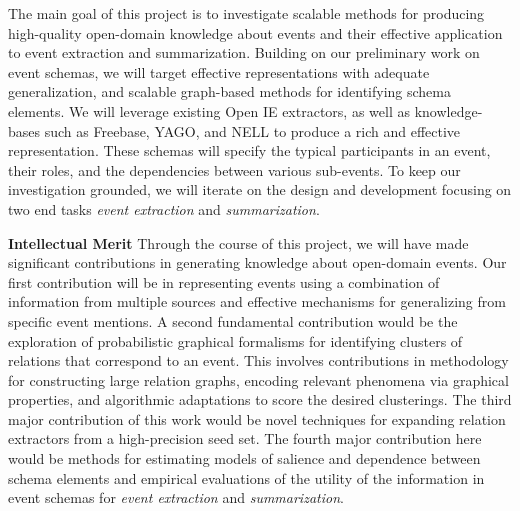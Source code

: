 The main goal of this project is to investigate scalable methods for producing high-quality open-domain knowledge about events and their effective application to event extraction and summarization. Building on our preliminary work on event schemas, we will target effective representations with adequate generalization, and scalable graph-based methods for identifying schema elements. We will leverage existing Open IE extractors, as well as knowledge-bases such as Freebase, YAGO, and NELL to produce a rich and effective representation. These schemas will specify the typical participants in an event, their roles, and the dependencies between various sub-events. To keep our investigation grounded, we will iterate on the design and development focusing on two end tasks {\em event extraction} and {\em summarization}. %

{\bf Intellectual Merit} Through the course of this project, we will have made significant contributions in generating knowledge about open-domain events. Our first contribution will be in representing events using a combination of information from multiple sources and effective mechanisms for generalizing from specific event mentions. A second fundamental contribution would be the exploration of probabilistic graphical formalisms for identifying clusters of relations that correspond to an event. This involves contributions in methodology for constructing large relation graphs, encoding relevant phenomena via graphical properties, and algorithmic adaptations to score the desired clusterings. The third major contribution of this work would be novel techniques for expanding relation extractors from a high-precision seed set. The fourth major contribution here would be methods for estimating models of salience and dependence between schema elements and empirical evaluations of the utility of the information in event schemas for {\em event extraction} and {\em summarization}.




